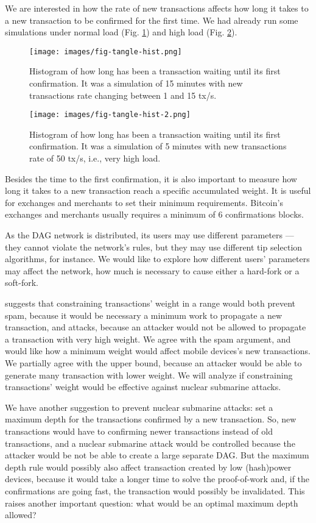 We are interested in how the rate of new transactions affects how long it takes to a new transaction to be confirmed for the first time. We had already run some simulations under normal load (Fig. \ref{fig-tangle-hist}) and high load (Fig. \ref{fig-tangle-hist-2}).

\begin{figure}[ht]
\centering\texttt{[image: images/fig-tangle-hist.png]}
\caption{Histogram of how long has been a transaction waiting until its first confirmation. It was a simulation of 15 minutes with new transactions rate changing between 1 and 15 tx/s.\label{fig-tangle-hist}}
\end{figure}

\begin{figure}[ht]
\centering\texttt{[image: images/fig-tangle-hist-2.png]}
\caption{Histogram of how long has been a transaction waiting until its first confirmation. It was a simulation of 5 minutes with new transactions rate of 50 tx/s, i.e., very high load.\label{fig-tangle-hist-2}}
\end{figure}


Besides the time to the first confirmation, it is also important to measure how long it takes to a new transaction reach a specific accumulated weight. It is useful for exchanges and merchants to set their minimum requirements. Bitcoin's exchanges and merchants usually requires a minimum of 6 confirmations blocks.

As the DAG network is distributed, its users may use different parameters --- they cannot violate the network's rules, but they may use different tip selection algorithms, for instance. We would like to explore how different users' parameters may affect the network, how much is necessary to cause either a hard-fork or a soft-fork.

\cite{tangle2016} suggests that constraining transactions' weight in a range would both prevent spam, because it would be necessary a minimum work to propagate a new transaction, and attacks, because an attacker would not be allowed to propagate a transaction with very high weight. We agree with the spam argument, and would like how a minimum weight would affect mobile devices's new transactions. We partially agree with the upper bound, because an attacker would be able to generate many transaction with lower weight. We will analyze if constraining transactions' weight would be effective against nuclear submarine attacks.

We have another suggestion to prevent nuclear submarine attacks: set a maximum depth for the transactions confirmed by a new transaction. So, new transactions would have to confirming newer transactions instead of old transactions, and a nuclear submarine attack would be controlled because the attacker would be not be able to create a large separate DAG. But the maximum depth rule would possibly also affect transaction created by low (hash)power devices, because it would take a longer time to solve the proof-of-work and, if the confirmations are going fast, the transaction would possibly be invalidated. This raises another important question: what would be an optimal maximum depth allowed?

